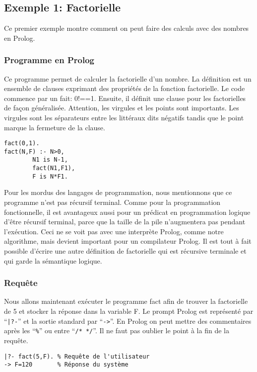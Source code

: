 \subsection{Exemple 1: Factorielle}

Ce premier exemple montre comment on peut faire des calculs avec des nombres en Prolog.

\subsubsection{Programme en Prolog}

Ce programme permet de calculer la factorielle d'un nombre.
La définition est un ensemble de clauses exprimant des propriétés de la fonction factorielle.
Le code commence par un fait: 0!==1.
Ensuite, il définit une clause pour les factorielles de façon généralisée.
Attention, les virgules et les points sont importants.
Les virgules sont les séparateurs entre les littéraux dits négatifs tandis que le point marque la fermeture de la clause.
\begin{verbatim}
fact(0,1).
fact(N,F) :- N>0, 
        N1 is N-1,
        fact(N1,F1), 
        F is N*F1.
\end{verbatim}
Pour les mordus des langages de programmation, nous mentionnons que ce programme n'est pas
récursif terminal.  Comme pour la programmation fonctionnelle, il est avantageux aussi pour un prédicat
en programmation logique
d'être récursif terminal, parce que la taille de la pile n'augmentera pas pendant l'exécution.
Ceci ne se voit pas avec une interprète Prolog, comme notre algorithme, mais devient important pour
un compilateur Prolog.
Il est tout à fait possible d'écrire une autre définition de factorielle qui est récursive terminale
et qui garde la sémantique logique.

\subsubsection{Requête}

Nous allons maintenant exécuter le programme fact afin de trouver la factorielle de 5 et stocker la réponse dans la variable F.
Le prompt Prolog est représenté par ``\verb+|?-+'' et la sortie standard par ``\verb+->+''.
En Prolog on peut mettre des commentaires après les ``\verb+%+'' ou entre ``\verb+/* */+''.
Il ne faut pas oublier le point à la fin de la requête.
\begin{verbatim} 
|?- fact(5,F). % Requête de l'utilisateur
-> F=120       % Réponse du système
\end{verbatim}

